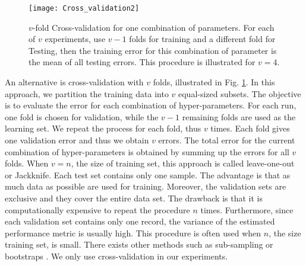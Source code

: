 \begin{figure}[h!]
	\centering
	\texttt{[image: Cross\_validation2]}
	\caption{$v$-fold Cross-validation for one combination of parameters. For each of $v$ experiments, use $v-1$ folds for training and a different fold for Testing, then the training error for this combination of parameter is the mean of all testing errors. This procedure is illustrated for $v=4$.}
	\label{fig:Cross_validation}
\end{figure}

An alternative is cross-validation with $v$ folds, illustrated in Fig. \ref{fig:Cross_validation}. In this approach, we partition the training data into $v$ equal-sized subsets. The objective is to evaluate the error for each combination of hyper-parameters. For each run, one fold is chosen for validation, while the $v-1$ remaining folds are used as the learning set. We repeat the process for each fold, thus $v$ times. Each fold gives one validation error and thus we obtain $v$ errors. The total error for the current combination of hyper-parameters is obtained by summing up the errors for all $v$ folds. When $v=n$, the size of training set, this approach is called leave-one-out or Jackknife. Each test set contains only one sample. The advantage is that as much data as possible are used for training. Moreover, the validation sets are exclusive and they cover the entire data set. The drawback is that it is computationally expensive to repeat the procedure $n$ times. Furthermore, since each validation set contains only one record, the variance of the estimated performance metric is usually high. This procedure is often used when $n$, the size training set, is small. There exists other methods such as sub-sampling or bootstraps \cite{Duda1973,Dreyfus2006}. We only use cross-validation in our experiments.

